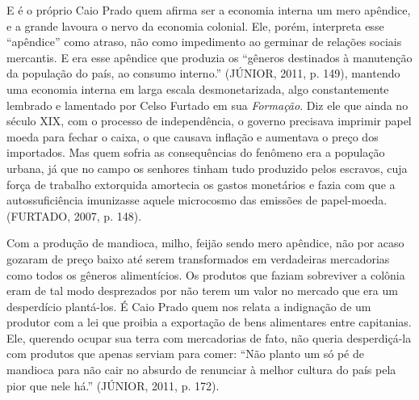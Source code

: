 E é o próprio Caio Prado quem afirma ser a economia interna um mero
apêndice, e a grande lavoura o nervo da economia colonial. Ele, porém,
interpreta esse ``apêndice'' como atraso, não como impedimento ao
germinar de relações sociais mercantis. E era esse apêndice que produzia
os ``gêneros destinados à manutenção da população do país, ao consumo
interno.'' (JÚNIOR, 2011, p. 149), mantendo uma economia
interna em larga escala desmonetarizada, algo constantemente lembrado e
lamentado por Celso Furtado em sua \emph{Formação}. Diz ele que ainda no
século XIX, com o processo de independência, o governo precisava
imprimir papel moeda para fechar o caixa, o que causava inflação e
aumentava o preço dos importados. Mas quem sofria as consequências do
fenômeno era a população urbana, já que no campo os senhores tinham tudo
produzido pelos escravos, cuja força de trabalho extorquida amortecia os
gastos monetários e fazia com que a autossuficiência imunizasse aquele
microcosmo das emissões de papel-moeda. (FURTADO, 2007, p. 148).

Com a produção de mandioca, milho, feijão sendo mero apêndice, não por
acaso gozaram de preço baixo até serem transformados em verdadeiras
mercadorias como todos os gêneros alimentícios. Os produtos que faziam
sobreviver a colônia eram de tal modo desprezados por não terem um valor
no mercado que era um desperdício plantá-los. É Caio Prado quem nos
relata a indignação de um produtor com a lei que proibia a exportação de
bens alimentares entre capitanias. Ele, querendo ocupar sua terra com
mercadorias de fato, não queria desperdiçá-la com produtos que apenas
serviam para comer: ``Não planto um só pé de mandioca para não cair no
absurdo de renunciar à melhor cultura do país pela pior que nele há.''
(JÚNIOR, 2011, p. 172).

